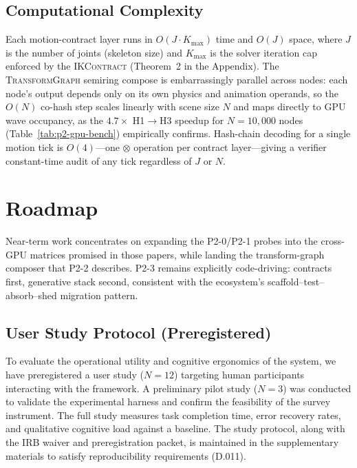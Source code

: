 \documentclass[sigconf,nonacm]{acmart}
\newcommand{\ikcontract}{\textsc{IKContract}}
\newcommand{\transformgraph}{\textsc{TransformGraph}}
\newcommand{\tropmult}{\otimes}
\begin{document}
\subsection{Computational Complexity}
\label{sec:p2:complexity}

Each motion-contract layer runs in $O(J \cdot K_{\max})$ time and $O(J)$
space, where $J$ is the number of joints (skeleton size) and $K_{\max}$ is
the solver iteration cap enforced by the \ikcontract{} (Theorem~2 in the
Appendix). The \transformgraph{} semiring compose is embarrassingly parallel
across nodes: each node's output depends only on its own physics and animation
operands, so the $O(N)$ co-hash step scales linearly with scene size $N$ and
maps directly to GPU wave occupancy, as the $4.7\times$ H1$\to$H3 speedup for
$N{=}10{,}000$ nodes (Table~\ref{tab:p2-gpu-bench}) empirically confirms.
Hash-chain decoding for a single motion tick is $O(4)$---one
$\tropmult$ operation per contract layer---giving a verifier constant-time
audit of any tick regardless of $J$ or $N$.

\section{Roadmap}

Near-term work concentrates on expanding the P2-0/P2-1 probes into the
cross-GPU matrices promised in those papers, while landing the transform-graph
composer that P2-2 describes. P2-3 remains explicitly code-driving: contracts
first, generative stack second, consistent with the ecosystem's
scaffold--test--absorb--shed migration pattern.


\subsection{User Study Protocol (Preregistered)}
\label{sec:user-study}

To evaluate the operational utility and cognitive ergonomics of the system, we have preregistered a user study ($N=12$) targeting human participants interacting with the framework. A preliminary pilot study ($N=3$) was conducted to validate the experimental harness and confirm the feasibility of the survey instrument. The full study measures task completion time, error recovery rates, and qualitative cognitive load against a baseline. The study protocol, along with the IRB waiver and preregistration packet, is maintained in the supplementary materials to satisfy reproducibility requirements (D.011).
\end{document}
